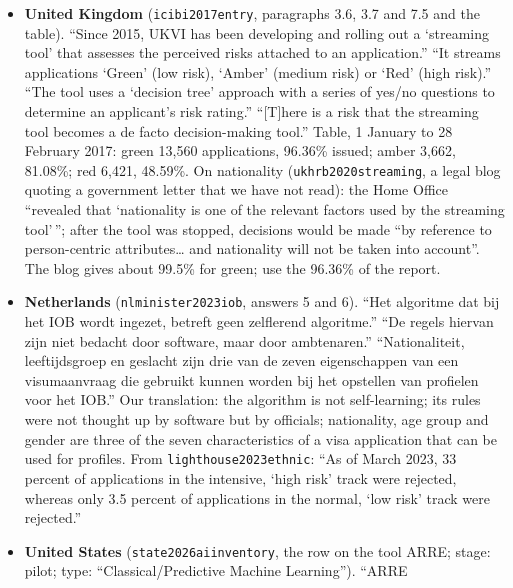 \documentclass[11pt]{article}
\begin{document}
{\begin{itemize}
        \texttt{laferriere2019augmented}, read on 2026-10-10; the site refused the
        download on 2026-10-12, so this one quote was not checked again.
  \item \textbf{United Kingdom} (\texttt{icibi2017entry}, paragraphs 3.6, 3.7 and 7.5
        and the table). ``Since 2015, UKVI has been developing and rolling out a
        `streaming tool' that assesses the perceived risks attached to an application.''
        ``It streams applications `Green' (low risk), `Amber' (medium risk) or `Red'
        (high risk).'' ``The tool uses a `decision tree' approach with a series of yes/no
        questions to determine an applicant's risk rating.'' ``[T]here is a risk that the
        streaming tool becomes a de facto decision-making tool.'' Table, 1 January to 28
        February 2017: green 13,560 applications, 96.36\% issued; amber 3,662, 81.08\%;
        red 6,421, 48.59\%. On nationality (\texttt{ukhrb2020streaming}, a legal blog
        quoting a government letter that we have not read): the Home Office ``revealed
        that `nationality is one of the relevant factors used by the streaming tool'\,'';
        after the tool was stopped, decisions would be made ``by reference to
        person-centric attributes\ldots{} and nationality will not be taken into
        account''. The blog gives about 99.5\% for green; use the 96.36\% of the report.
  \item \textbf{Netherlands} (\texttt{nlminister2023iob}, answers 5 and 6). ``Het
        algoritme dat bij het IOB wordt ingezet, betreft geen zelflerend algoritme.''
        ``De regels hiervan zijn niet \guillemotleft bedacht\guillemotright{} door
        software, maar door ambtenaren.'' ``Nationaliteit, leeftijdsgroep en geslacht
        zijn drie van de zeven eigenschappen van een visumaanvraag die gebruikt kunnen
        worden bij het opstellen van profielen voor het IOB.'' Our translation: the
        algorithm is not self-learning; its rules were not thought up by software but by
        officials; nationality, age group and gender are three of the seven
        characteristics of a visa application that can be used for profiles. From
        \texttt{lighthouse2023ethnic}: ``As of March 2023, 33 percent of applications in
        the intensive, `high risk' track were rejected, whereas only 3.5 percent of
        applications in the normal, `low risk' track were rejected.''
  \item \textbf{United States} (\texttt{state2026aiinventory}, the row on the tool
        ARRE; stage: pilot; type: ``Classical/Predictive Machine Learning''). ``ARRE

\end{itemize}}
\end{document}
